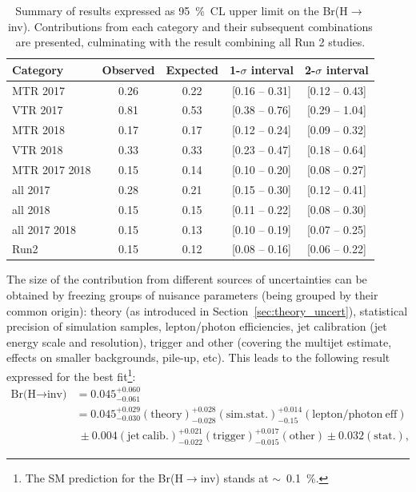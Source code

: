 \begin{table}[h!]
    \centering
    \begin{tabular}{l c c c c}
       \hline
       Category & Observed  & Expected  & 1-$\sigma$ interval & 2-$\sigma$ interval \\
       \hline
                      MTR 2017  & 0.26  & 0.22  & [0.16 -- 0.31]  & [0.12 -- 0.43] \\ 
                      VTR 2017  & 0.81  & 0.53  & [0.38 -- 0.76] & [0.29 -- 1.04]\\
                      MTR 2018  & 0.17  & 0.17  & [0.12 -- 0.24]  & [0.09 -- 0.32] \\ 
                      VTR 2018  & 0.33  & 0.33  & [0.23 -- 0.47]  & [0.18 -- 0.64]\\
                 MTR 2017 2018  & 0.15  & 0.14  & [0.10 -- 0.20]  & [0.08 -- 0.27] \\ 
                      all 2017  & 0.28  & 0.21  & [0.15 -- 0.30]  & [0.12 -- 0.41] \\ 
                      all 2018  & 0.15  & 0.15  & [0.11 -- 0.22]  & [0.08 -- 0.30] \\ 
                 all 2017 2018  & 0.15  & 0.13  & [0.10 -- 0.19]  & [0.07 -- 0.25] \\ 
                          Run2  & 0.15  & 0.12  & [0.08 -- 0.16]  & [0.06 -- 0.22] \\ 
       \hline
    \end{tabular}
    \caption{Summary of results expressed as 95~\%~CL upper limit on the Br(H$\rightarrow$inv). Contributions from each category and their subsequent combinations are presented, culminating with the result combining all Run 2 studies. }
    \label{tab:limits}
\end{table}

\hspace{10pt} The size of the contribution from different sources of uncertainties can be obtained by freezing groups of nuisance parameters (being grouped by their common origin): theory (as introduced in Section~\ref{sec:theory_uncert}), statistical precision of simulation samples, lepton/photon efficiencies, jet calibration (jet energy scale and resolution), trigger and other (covering the multijet estimate, effects on smaller backgrounds, pile-up, etc). This leads to the following result expressed for the best fit\footnote{The SM prediction for the Br(H$\rightarrow$inv) stands at $\sim$~0.1~\%.}:
\begin{equation} 
\begin{split}
\text{Br(H}\rightarrow \text{inv)} & = 0.045 ^{+0.060}_{-0.061}\\
        & = 0.045 ^{+0.029}_{-0.030} (\mathrm{theory}) ^{+0.028}_{-0.028} (\mathrm{sim. stat.}) ^{+0.014}_{-0.15} (\mathrm{lepton/photon~eff}) \\
        & ~ \pm 0.004 (\mathrm{jet~calib.}) 
         ^{+0.021}_{-0.022} (\mathrm{trigger}) ^{+0.017}_{-0.015} (\mathrm{other})\pm 0.032 (\mathrm{stat.}),
\end{split}
\end{equation}

